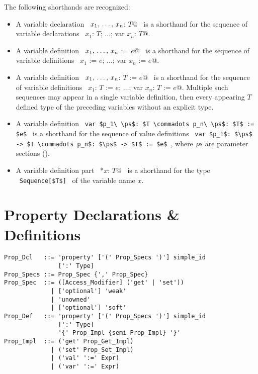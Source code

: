 The following shorthands are recognized:
\begin{itemize}
  \item[] A variable declaration ~\lstinline@var $x_1 ,\, \ldots ,\, x_n$: $T$@~ is a
shorthand for the sequence of variable declarations ~\lstinline@var $x_1$: $T$; $\ldots$; var $x_n$: $T$@. 

  \item[] A variable definition ~\lstinline@var $x_1 ,\, \ldots ,\, x_n$ := $e$@~ is a shorthand for the sequence of variable definitions ~\lstinline@var $x_1$ := $e$; $\ldots$; var $x_n$ := $e$@. 

  \item[] A variable definition ~\lstinline@var $x_1 ,\, \ldots ,\, x_n$: $T$ := $e$@~ is a shorthand for the sequence of variable definitions ~\lstinline@var $x_1$: $T$ := $e$; $\ldots$; var $x_n$: $T$ := $e$@. Multiple such sequences may appear in a single variable definition, then every appearing $T$ defined type of the preceding variables without an explicit type. 

  \item[] A variable definition ~\lstinline!var $p_1\ \ps$: $T \commadots p_n\ \ps$: $T$ := $e$!~ is a shorthand for the sequence of value definitions ~\lstinline!var $p_1$: $\ps$ -> $T \commadots p_n$: $\ps$ -> $T$ := $e$!~, where $\mbox{\sl ps}$ are parameter sections ().
  
  \item[] A variable definition part ~\lstinline@*$x$: $T$@~ is a shorthand for the type ~\lstinline!Sequence[$T$]!~ of the variable name $x$. 
\end{itemize}






\section{Property Declarations \& Definitions}
\label{sec:property-dec-dfn}

\syntax\begin{lstlisting}
Prop_Dcl   ::= 'property' ['(' Prop_Specs ')'] simple_id 
               [':' Type]
Prop_Specs ::= Prop_Spec {',' Prop_Spec}
Prop_Spec  ::= ([Access_Modifier] ('get' | 'set')) 
             | ['optional'] 'weak'
             | 'unowned'
             | ['optional'] 'soft'
Prop_Def   ::= 'property' ['(' Prop_Specs ')'] simple_id 
               [':' Type]
               '{' Prop_Impl {semi Prop_Impl} '}'
Prop_Impl  ::= ('get' Prop_Get_Impl)
             | ('set' Prop_Set_Impl)
             | ('val' ':=' Expr)
             | ('var' ':=' Expr)
\end{lstlisting} %

